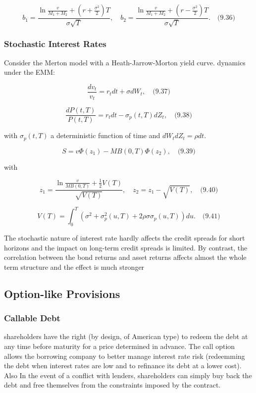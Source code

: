 \documentclass[12pt,a4paper]{article}
\begin{document}
$$b_1 = \frac{\ln \frac{v}{M_1 + M_2} + (r + \frac{\sigma^2}{2})T}{\sigma\sqrt{T}}, \quad b_2 = \frac{\ln \frac{v}{M_1 + M_2} + (r - \frac{\sigma^2}{2})T}{\sigma\sqrt{T}}. \quad \text{(9.36)}$$


\subsubsection{ Stochastic Interest Rates}
Consider the Merton model with a Heath-Jarrow-Morton yield curve. dynamics under the EMM:

$$\frac{dv_t}{v_t} = r_t dt + \sigma dW_t, \quad \text{(9.37)}$$

$$\frac{dP(t,T)}{P(t,T)} = r_t dt - \sigma_p(t,T) dZ_t, \quad \text{(9.38)}$$

with $\sigma_p(t,T)$ a deterministic function of time and $dW_t dZ_t = \rho dt$.

$$S = v\Phi(z_1) - MB(0,T)\Phi(z_2), \quad \text{(9.39)}$$

with

$$z_1 = \frac{\ln \frac{v}{MB(0,T)} + \frac{1}{2}V(T)}{\sqrt{V(T)}}, \quad z_2 = z_1 - \sqrt{V(T)}, \quad \text{(9.40)}$$

$$V(T) = \int_0^T (\sigma^2 + \sigma_p^2(u,T) + 2\rho\sigma\sigma_p(u,T)) du. \quad \text{(9.41)}$$

The stochastic nature of interest rate hardly affects the credit spreads for short horizons and the 
impact on long-term credit spreads is limited. By contrast, the 
correlation between the bond returns and asset returns affects almost the whole term structure 
and the effect is much stronger 


\subsection{Option-like Provisions }
\subsubsection{Callable Debt }
shareholders have the right (by design, of American type) to redeem the debt at any time before maturity for a price determined in advance.
The call option allows the borrowing company to better manage interest rate risk (redeemming the debt when interest rates are low and to refinance its debt at a lower cost). Also In the event of a conflict with lenders, shareholders can simply buy back the debt  and free themselves from the constraints imposed by the contract.
\end{document}
